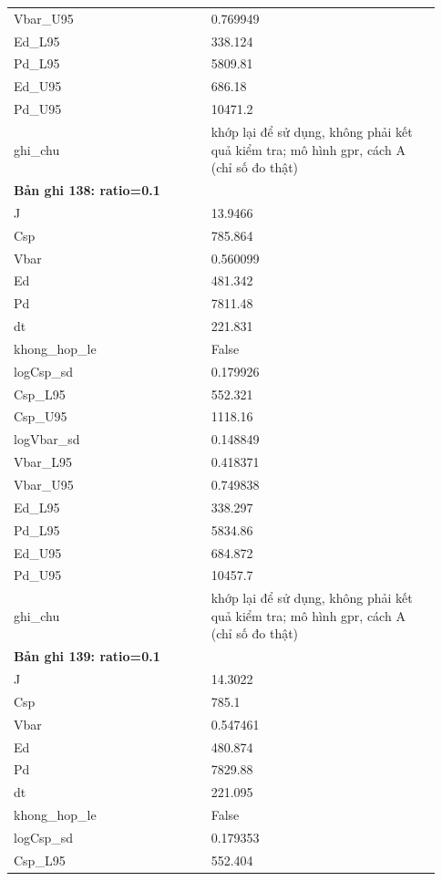 \begin{longtable}{p{0.43\linewidth}p{0.50\linewidth}}
Vbar\_\allowbreak U95 & 0.769949 \\
Ed\_\allowbreak L95 & 338.124 \\
Pd\_\allowbreak L95 & 5809.81 \\
Ed\_\allowbreak U95 & 686.18 \\
Pd\_\allowbreak U95 & 10471.2 \\
ghi\_\allowbreak chu & khớp lại để sử dụng, không phải kết quả kiểm tra; mô hình gpr, cách A (chỉ số đo thật) \\
\midrule
\multicolumn{2}{p{0.95\linewidth}}{\textbf{Bản ghi 138: ratio=0.1}} \\
J & 13.9466 \\
Csp & 785.864 \\
Vbar & 0.560099 \\
Ed & 481.342 \\
Pd & 7811.48 \\
dt & 221.831 \\
khong\_\allowbreak hop\_\allowbreak le & False \\
logCsp\_\allowbreak sd & 0.179926 \\
Csp\_\allowbreak L95 & 552.321 \\
Csp\_\allowbreak U95 & 1118.16 \\
logVbar\_\allowbreak sd & 0.148849 \\
Vbar\_\allowbreak L95 & 0.418371 \\
Vbar\_\allowbreak U95 & 0.749838 \\
Ed\_\allowbreak L95 & 338.297 \\
Pd\_\allowbreak L95 & 5834.86 \\
Ed\_\allowbreak U95 & 684.872 \\
Pd\_\allowbreak U95 & 10457.7 \\
ghi\_\allowbreak chu & khớp lại để sử dụng, không phải kết quả kiểm tra; mô hình gpr, cách A (chỉ số đo thật) \\
\midrule
\multicolumn{2}{p{0.95\linewidth}}{\textbf{Bản ghi 139: ratio=0.1}} \\
J & 14.3022 \\
Csp & 785.1 \\
Vbar & 0.547461 \\
Ed & 480.874 \\
Pd & 7829.88 \\
dt & 221.095 \\
khong\_\allowbreak hop\_\allowbreak le & False \\
logCsp\_\allowbreak sd & 0.179353 \\
Csp\_\allowbreak L95 & 552.404 \\

\end{longtable}
